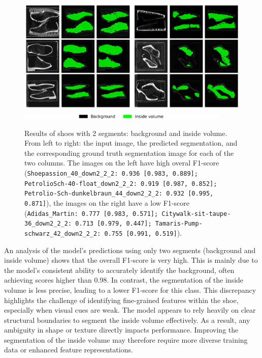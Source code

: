 \begin{figure}[H]
	\centering
	\includegraphics[width=1.0\textwidth]{./images/Paper_2Segments.png}
	\includegraphics[width=0.9\textwidth]{./images/color_legend_2_classes.png}
	\caption[Results of shoes with 2 segments: background and inside volume]{Results of shoes with 2 segments: background and inside volume. From left to right: the input image, the predicted segmentation, and the corresponding ground truth segmentation image for each of the two columns. The images on the left have high overal F1-score ({\tt \small Shoepassion\_40\_down2\_2\_2: 0.936 [0.983, 0.889]\footnotemark; PetrolioSch-40-float\_down2\_2\_2: 0.919 [0.987, 0.852]; Petrolio-Sch-dunkelbraun\_44\_down2\_2\_2: 0.932 [0.995, 0.871]}), the images on the right have a low F1-score ({\tt \small Adidas\_Martin: 0.777 [0.983, 0.571]; Citywalk-sit-taupe-36\_down2\_2\_2: 0.713 [0.979, 0.447]; Tamaris-Pump-schwarz\_42\_down2\_2\_2: 0.755 [0.991, 0.519]}).}
	\label{Paper_2Segments}
\end{figure}

An analysis of the model's predictions using only two segments (background and inside volume) shows that the overall F1-score is very high. This is mainly due to the model's consistent ability to accurately identify the background, often achieving scores higher than 0.98. In contrast, the segmentation of the inside volume is less precise, leading to a lower F1-score for this class. This discrepancy highlights the challenge of identifying fine-grained features within the shoe, especially when visual cues are weak. The model appears to rely heavily on clear structural boundaries to segment the inside volume effectively. As a result, any ambiguity in shape or texture directly impacts performance. Improving the segmentation of the inside volume may therefore require more diverse training data or enhanced feature representations.

